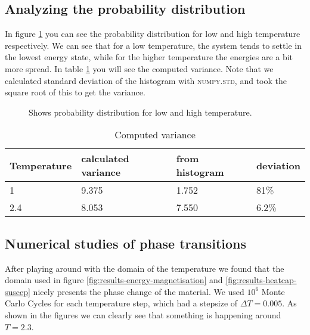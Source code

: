\documentclass[../main.tex]{subfiles}
\begin{document}
\subsection{Analyzing the probability distribution}
In figure \ref{fig:results-ProbE_T24} you can see the probability distribution for low and high temperature respectively. We can see that for a low temperature, the system tends to settle in the lowest energy state, while for the higher temperature the energies are a bit more spread. In table \ref{tab:results-variance} you will see the computed variance. Note that we calculated standard deviation of the histogram with \textsc{numpy.std}, and took the square root of this to get the variance.

\begin{figure}[!h]
  \centering
  \caption{Shows probability distribution for low and high temperature.}
  \label{fig:results-ProbE_T24}
\end{figure}
\FloatBarrier


\begin{table}[!h]
  \begin{center}
    \begin{tabular}{|l| l| l| l|}
      \hline
      Temperature & calculated variance & from histogram & deviation\\
      \hline
      1 & 9.375 & 1.752 & 81\%\\
      2.4 & 8.053  & 7.550 & 6.2\%\\
      \hline
    \end{tabular}
    \caption{Computed variance}
    \label{tab:results-variance}
  \end{center}
\end{table}
\FloatBarrier

\subsection{Numerical studies of phase transitions}
After playing around with the domain of the temperature we found that the domain used in figure \ref{fig:results-energy-magnetisation} and \ref{fig:results-heatcap-suscep} nicely presents the phase change of the material. We used $10^6$ Monte Carlo Cycles for each temperature step, which had a stepsize of $\Delta T = 0.005$. As shown in the figures we can clearly see that something is happening around $T = 2.3$.
\end{document}
